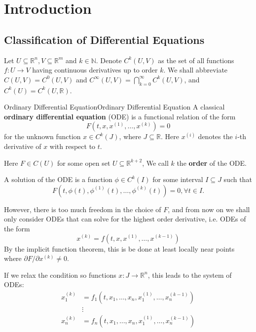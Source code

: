 \documentclass[../main.tex]{subfiles}
\begin{document}
\chapter{Introduction}

\section{Classification of Differential Equations}
Let $U \subseteq \mathbb{R}^n, V \subseteq \mathbb{R}^m$ and $k\in \mathbb{N}$. Denote $C^k(U,V)$ as the set of all functions $f: U \to V$ having continuous derivatives up to order $k$. We shall abbreviate $C(U,V) = C^0(U,V)$ and $C^\infty(U,V) = \bigcap_{k=0}^\infty C^k(U,V)$, and $C^k(U) = C^k(U,\mathbb{R})$.

\begin{definition}{Ordinary Differential Equation}{Ordinary Differential Equation}
  A classical \textbf{ordinary differential equation} (ODE) is a functional relation of the form
  \begin{equation}
    F(t, x, x^{(1)}, \dots, x^{(k)}) = 0
  \end{equation}
  for the unknown function $x\in C^k(J)$, where $J \subseteq \mathbb{R}$. Here $x^{(i)}$ denotes the $i$-th derivative of $x$ with respect to $t$. 

  Here $F\in C(U)$ for some open set $U \subseteq \mathbb{R}^{k+2}$, We call $k$ the \textbf{order} of the ODE.

  A solution of the ODE is a function $\phi\in C^k(I)$ for some interval $I \subseteq J$ such that
  \begin{equation*}
    F(t, \phi(t), \phi^{(1)}(t), \dots, \phi^{(k)}(t)) = 0, \forall t \in I.
  \end{equation*}
\end{definition}

However, there is too much freedom in the choice of $F$, and from now on we shall only consider ODEs that can solve for the highest order derivative, i.e. ODEs of the form
\begin{equation*}
  x^{(k)} = f(t, x, x^{(1)}, \dots, x^{(k-1)})
\end{equation*}
By the implicit function theorem, this is be done at least locally near points where $\partial F/\partial x^{(k)} \neq 0$.

If we relax the condition so functions $x: J \to \mathbb{R}^n$, this leads to the system of ODEs:
\begin{equation*}
  \begin{aligned}
    x_1^{(k)} &= f_1(t, x_1, \dots, x_n, x_1^{(1)}, \dots, x_n^{(k-1)}) \\
    &\vdots \\
    x_n^{(k)} &= f_n(t, x_1, \dots, x_n, x_1^{(1)}, \dots, x_n^{(k-1)})
  \end{aligned}
\end{equation*}
\end{document}
